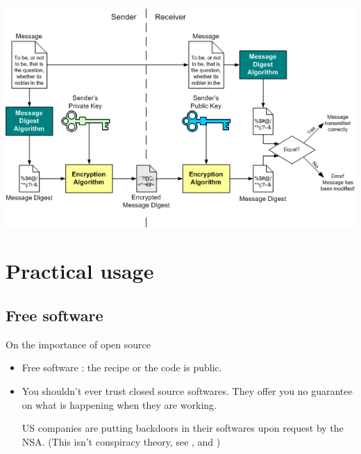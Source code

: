 \documentclass[compress]{beamer}
\theoremstyle{definition}
\theoremstyle{definition}
\theoremstyle{definition}
\theoremstyle{remark}
\theoremstyle{remark}
\theoremstyle{definition}
\theoremstyle{definition}
\theoremstyle{definition}
\theoremstyle{definition}
\theoremstyle{definition}
\theoremstyle{remark}
\theoremstyle{remark}
\theoremstyle{remark}
\theoremstyle{remark}
\begin{document}
				\begin{frame}
					\begin{center}\includegraphics[scale=1.1]{./digitalsig}\end{center}
				\end{frame}
		\section{Practical usage}
			\subsection{Free software}
			\begin{frame}
				\begin{block}{On the importance of open source}
				\begin{itemize}
				\item Free software : the recipe or the code is public.
				\vspace*{10mm}
				
				\item You shouldn't ever trust closed source softwares. They offer you no guarantee on what is happening when they are working.
				
				US companies are putting backdoors in their softwares upon request by the NSA. (This isn't conspiracy theory, see \cite{scheneir},  \cite{nytcrypt} and \cite{greenwcrypt})
				\end{itemize}
				\end{block}
			\end{frame}
\end{document}
